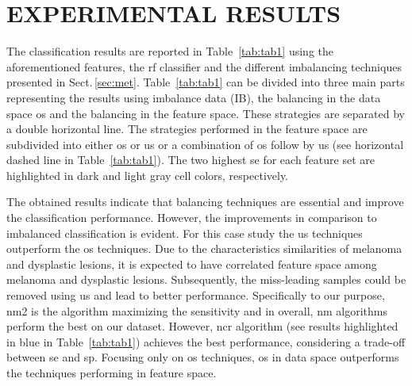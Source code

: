\graphicspath{ {./content/Experiments-results/figures/} }


\section{\uppercase{Experimental Results}}
\label{sec:exp-res} 

\noindent The classification results are reported in Table~\ref{tab:tab1} using the aforementioned features, the \ac{rf} classifier and the different imbalancing techniques presented in Sect.\,\ref{sec:met}. 
Table~\ref{tab:tab1} can be divided into three main parts representing the results using imbalance data (IB), the balancing in the data space \ac{os} and the balancing in the feature space.
These strategies are separated by a double horizontal line.
The strategies performed in the feature space are subdivided into either \ac{os} or \ac{us} or a combination of \ac{os} follow by \ac{us} (see horizontal dashed line in Table~\ref{tab:tab1}).
The two highest \ac{se} for each feature set are highlighted in dark and light gray cell colors, respectively. 



The obtained results indicate that balancing techniques are essential and improve the classification performance. 
However, the improvements in comparison to imbalanced classification is evident. 
For this case study the \ac{us} techniques outperform the \ac{os} techniques. 
Due to the characteristics similarities of melanoma and dysplastic lesions, it is expected to have correlated feature space among melanoma and dysplastic lesions. 
Subsequently, the miss-leading samples could be removed using \ac{us} and lead to better performance.
Specifically to our purpose, \ac{nm2} is the algorithm maximizing the sensitivity and in overall, \ac{nm} algorithms perform the best on our dataset. 
However, \ac{ncr} algorithm (see results highlighted in blue in Table~\ref{tab:tab1}) achieves the best performance, considering a trade-off between \ac{se} and \ac{sp}. 
Focusing only on \ac{os} techniques, \ac{os} in data space outperforms the techniques performing in feature space.





